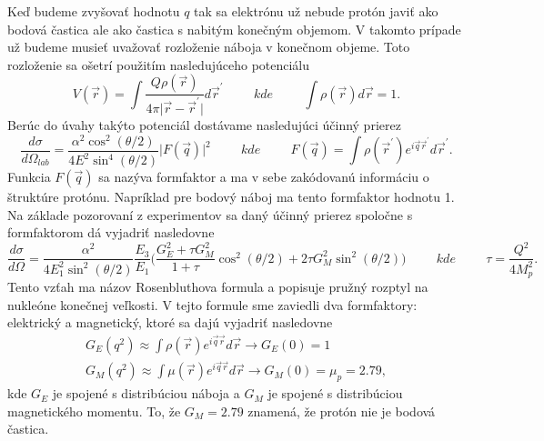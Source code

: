 \documentclass[../../main.tex]{subfiles}
\begin{document}
Keď budeme zvyšovať hodnotu $q$ tak sa elektrónu už nebude protón javiť ako bodová častica ale ako častica s nabitým konečným objemom. V takomto prípade už budeme musieť uvažovať rozloženie náboja v konečnom objeme. Toto rozloženie sa ošetrí použitím nasledujúceho potenciálu
$$ V({\vec{r}}) =\int \frac{Q\rho(\vec{r})}{4\pi \vert \vec{r}-\vec{r}^{\prime} \vert} d\vec{r}^{\prime} \hspace{1cm} kde \hspace{1cm} \int \rho(\vec{r})d\vec{r}=1 .$$
Berúc do úvahy takýto potenciál dostávame nasledujúci účinný prierez
\begin{equation}
\frac{d\sigma}{d\Omega_{lab}} = \frac{\alpha^2 \cos^2(\theta/2)}{4E^2 \sin^4(\theta/2)}\vert F(\vec{q}) \vert^2  \hspace{1cm} kde \hspace{1cm} F(\vec{q}) = \int \rho(\vec{r}^{\prime}) e^{i\vec{q}\vec{r}^{\prime}}d\vec{r}^{\prime}.
\label{sf2:mott}
\end{equation} 
Funkcia $F(\vec{q})$ sa nazýva formfaktor a ma v sebe zakódovanú informáciu o štruktúre protónu. Napríklad pre bodový náboj ma tento formfaktor hodnotu 1.
Na základe pozorovaní z experimentov sa daný účinný prierez spoločne s  formfaktorom dá vyjadriť nasledovne
$$ \frac{d\sigma}{d\Omega} = \frac{\alpha^2}{4E_1^2\sin^2(\theta/2)} \frac{E_3}{E_1} \bigg( \frac{G^2_E + \tau G_M^2}{1+\tau}\cos^2(\theta/2)+2\tau G_M^2\sin^2(\theta/2) \bigg) \hspace{1cm} kde \hspace{1cm} \tau = \frac{Q^2}{4M^2_p}. $$
Tento vzťah ma názov Rosenbluthova formula a popisuje pružný rozptyl na nukleóne konečnej veľkosti. V tejto formule sme zaviedli dva formfaktory: elektrický a magnetický, ktoré sa dajú vyjadriť nasledovne
\begin{equation}
\begin{gathered}
G_E(q^2) \approx \int \rho(\vec{r})e^{i\vec{q}\vec{r}} d\vec{r} \rightarrow G_E(0)=1  \\ 
G_M(q^2) \approx \int \mu(\vec{r})e^{i\vec{q}\vec{r}} d\vec{r} \rightarrow G_M(0)=\mu_{p}=2.79,
\end{gathered}
\end{equation} 
kde $G_E$ je spojené s distribúciou náboja a $G_M$ je spojené s distribúciou magnetického momentu. To, že $G_M=2.79$ znamená, že protón nie je bodová častica. 
\end{document}
